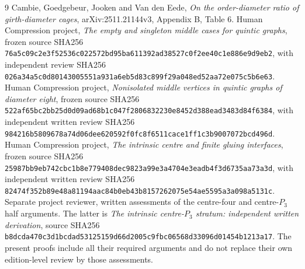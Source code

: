 \documentclass[11pt]{article}
\begin{document}
\begin{thebibliography}{9}
 Cambie, Goedgebeur, Jooken and Van den Eede,
\emph{On the order-diameter ratio of girth-diameter cages},
arXiv:2511.21144v3, Appendix B, Table 6.
 Human Compression project,
\emph{The empty and singleton middle cases for quintic graphs},
frozen source SHA256
\texttt{76a5c09c2e3f52536c022572bd95ba611392ad38527c0f2ee40c1e886e9d9eb2},
with independent review SHA256
\texttt{026a34a5c0d80143005551a931a6eb5d83c899f29a048ed52aa72e075c5b6e63}.
 Human Compression project,
\emph{Nonisolated middle vertices in quintic graphs of diameter eight},
frozen source SHA256
\texttt{522af65bc2bb25d0d09ad68b1c047f2806832230e8452d388ead3483d84f6384},
with independent written review SHA256
\texttt{984216b5809678a74d06dee620592f0fc8f6511cace1ff1c3b9007072bcd496d}.
 Human Compression project,
\emph{The intrinsic centre and finite gluing interfaces},
frozen source SHA256
\texttt{25987bb9eb742cbc1b8e779408dec9823a99e3a4704e3eadb4f3d6735aa73a3d},
with independent written review SHA256
\texttt{82474f352b89e48a81194aac84b0eb43b8157262075e54ae5595a3a098a5131c}.
 Separate project reviewer,
written assessments of the centre-four and centre-$P_3$ half arguments.
The latter is \emph{The intrinsic centre-$P_3$ stratum: independent
written derivation}, source SHA256
\texttt{b8dcda470c3d1bcdad53125159d66d2005c9fbc06568d33096d01454b1213a17}.
The present proofs include all their required arguments and do not
replace their own edition-level review by those assessments.
\end{thebibliography}
\end{document}

